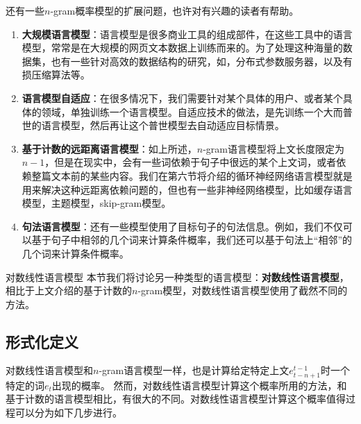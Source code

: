 \documentclass[10pt,a4paper]{ctexart}
\makeatletter
\renewcommand{\section}{\@startsection{section}{1}{0mm}
  {-\baselineskip}{0.5\baselineskip}{\bf\leftline}}
\makeatother
\begin{document}
还有一些$n$-gram概率模型的扩展问题，也许对有兴趣的读者有帮助。
\begin{enumerate}
\item[] \textbf{大规模语言模型}：语言模型是很多商业工具的组成部件，在这些工具中的语言模型，常常是在大规模的网页文本数据上训练而来的。为了处理这种海量的数据集，也有一些针对高效的数据结构的研究，如\cite{heafield2011kenlm,pauls2011faster}，分布式参数服务器\cite{brants2007large}，以及有损压缩算法\cite{talbot2008randomized}等。
\item[] \textbf{语言模型自适应}：在很多情况下，我们需要针对某个具体的用户、或者某个具体的领域，单独训练一个语言模型。自适应技术的做法，是先训练一个大而普世的语言模型，然后再让这个普世模型去自动适应目标情景\cite{bellegarda2004statistical}。
\item[] \textbf{基于计数的远距离语言模型}：如上所述，$n$-gram语言模型将上文长度限定为$n-1$，但是在现实中，会有一些词依赖于句子中很远的某个上文词，或者依赖整篇文本前的某些内容。我们在第六节将介绍的循环神经网络语言模型就是用来解决这种远距离依赖问题的，但也有一些非神经网络模型，比如缓存语言模型\cite{kuhn1990cache}，主题模型\cite{blei2003latent}，skip-gram模型\cite{goodman2001bit}。
\item[] \textbf{句法语言模型}：还有一些模型使用了目标句子的句法信息。例如，我们不仅可以基于句子中相邻的几个词来计算条件概率，我们还可以基于句法上“相邻”的几个词来计算条件概率\cite{shen2008new}。
\end{enumerate}


\section{对数线性语言模型}
本节我们将讨论另一种类型的语言模型：\textbf{对数线性语言模型}\cite{rosenfeld1996maximum,chen2000survey}，相比于上文介绍的基于计数的$n$-gram模型，对数线性语言模型使用了截然不同的方法。

\subsection{形式化定义}
对数线性语言模型和$n$-gram语言模型一样，也是计算给定特定上文$e_{t-n+1}^{t-1}$时一个特定的词$e_t$出现的概率。
然而，对数线性语言模型计算这个概率所用的方法，和基于计数的语言模型相比，有很大的不同。对数线性语言模型计算这个概率值得过程可以分为如下几步进行。
\end{document}
